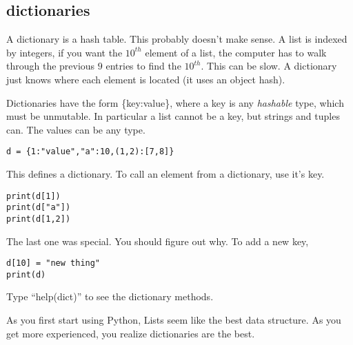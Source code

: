 \documentclass[11pt,letterpaper]{article}
\begin{document}
\subsection{dictionaries}
A dictionary is a hash table. This probably doesn't make sense. A list is indexed by integers,
if you want the $10^{th}$ element of a list, the computer has to walk through the previous $9$ 
entries to find the $10^{th}$. This can be slow. A dictionary just knows where each element is 
located (it uses an object hash). 

Dictionaries have the form \{key:value\}, where a key is any \emph{hashable} type, which must be
unmutable. In particular a list cannot be a key, but strings and tuples can. The values can be any
type.

\begin{verbatim}
d = {1:"value","a":10,(1,2):[7,8]}
\end{verbatim}
This defines a dictionary. To call an element from a dictionary, use it's key.
\begin{verbatim}
print(d[1])
print(d["a"])
print(d[1,2])
\end{verbatim}
The last one was special. You should figure out why. To add a new key,
\begin{verbatim}
d[10] = "new thing"
print(d)
\end{verbatim}

Type ``help(dict)'' to see the dictionary methods. 

As you first start using Python, Lists seem like the best data structure. As you get more
experienced, you realize dictionaries are the best. 
\end{document}
